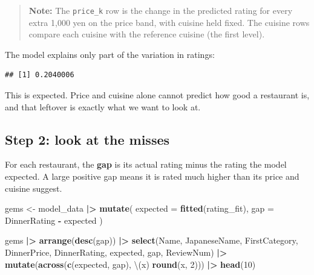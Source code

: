 \documentclass[
]{article}
\newenvironment{Shaded}{\begin{snugshade}}{\end{snugshade}}
\newcommand{\AttributeTok}[1]{\textcolor[rgb]{0.13,0.29,0.53}{#1}}
\newcommand{\DecValTok}[1]{\textcolor[rgb]{0.00,0.00,0.81}{#1}}
\newcommand{\FunctionTok}[1]{\textcolor[rgb]{0.13,0.29,0.53}{\textbf{#1}}}
\newcommand{\NormalTok}[1]{#1}
\newcommand{\OtherTok}[1]{\textcolor[rgb]{0.56,0.35,0.01}{#1}}
\newcommand{\SpecialCharTok}[1]{\textcolor[rgb]{0.81,0.36,0.00}{\textbf{#1}}}
\begin{document}
\begin{quote}
\textbf{Note:} The \texttt{price\_k} row is the change in the predicted
rating for every extra 1,000 yen on the price band, with cuisine held
fixed. The cuisine rows compare each cuisine with the reference cuisine
(the first level).
\end{quote}

The model explains only part of the variation in ratings:

\begin{Shaded}
\end{Shaded}

\begin{verbatim}
## [1] 0.2040006
\end{verbatim}

This is expected. Price and cuisine alone cannot predict how good a
restaurant is, and that leftover is exactly what we want to look at.

\subsection{Step 2: look at the misses}\label{step-2-look-at-the-misses}

For each restaurant, the \textbf{gap} is its actual rating minus the
rating the model expected. A large positive gap means it is rated much
higher than its price and cuisine suggest.

\begin{Shaded}
\begin{Highlighting}[]
\NormalTok{gems }\OtherTok{\textless{}{-}}\NormalTok{ model\_data }\SpecialCharTok{|\textgreater{}}
  \FunctionTok{mutate}\NormalTok{(}
    \AttributeTok{expected =} \FunctionTok{fitted}\NormalTok{(rating\_fit),}
    \AttributeTok{gap      =}\NormalTok{ DinnerRating }\SpecialCharTok{{-}}\NormalTok{ expected}
\NormalTok{  )}

\NormalTok{gems }\SpecialCharTok{|\textgreater{}}
  \FunctionTok{arrange}\NormalTok{(}\FunctionTok{desc}\NormalTok{(gap)) }\SpecialCharTok{|\textgreater{}}
  \FunctionTok{select}\NormalTok{(Name, JapaneseName, FirstCategory, DinnerPrice,}
\NormalTok{         DinnerRating, expected, gap, ReviewNum) }\SpecialCharTok{|\textgreater{}}
  \FunctionTok{mutate}\NormalTok{(}\FunctionTok{across}\NormalTok{(}\FunctionTok{c}\NormalTok{(expected, gap), \textbackslash{}(x) }\FunctionTok{round}\NormalTok{(x, }\DecValTok{2}\NormalTok{))) }\SpecialCharTok{|\textgreater{}}
  \FunctionTok{head}\NormalTok{(}\DecValTok{10}\NormalTok{)}
\end{Highlighting}
\end{Shaded}
\end{document}
